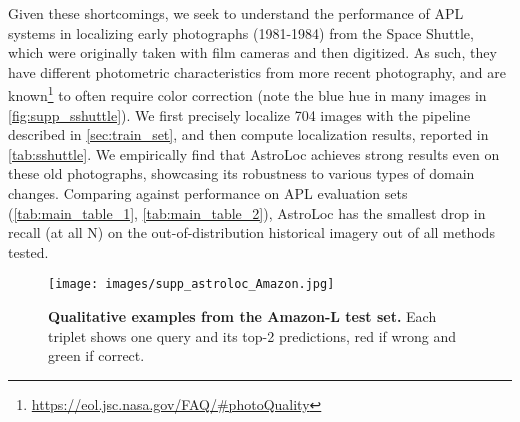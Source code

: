 Given these shortcomings, we seek to understand the performance of APL systems in localizing early photographs (1981-1984) from the Space Shuttle, which were originally taken with film cameras and then digitized. As such, they have different photometric characteristics from more recent photography, and are known\footnote{\url{https://eol.jsc.nasa.gov/FAQ/\#photoQuality}} to often require color correction (note the blue hue in many images in \cref{fig:supp_sshuttle}). We first precisely localize 704 images with the pipeline described in \cref{sec:train_set}, and then compute localization results, reported in \cref{tab:sshuttle}.
We empirically find that AstroLoc achieves strong results even on these old photographs, showcasing its robustness to various types of domain changes. Comparing against performance on APL evaluation sets (\cref{tab:main_table_1}, \ref{tab:main_table_2}), AstroLoc has the smallest drop in recall (at all N) on the out-of-distribution historical imagery out of all methods tested.


\begin{figure*}[h]
    \begin{center}
    \texttt{[image: images/supp\_astroloc\_Amazon.jpg]}
    \end{center}
    \caption{\textbf{Qualitative examples from the Amazon-L test set.} Each triplet shows one query and its top-2 predictions, red if wrong and green if correct. }
    \label{fig:supp_astroloc_Amazon}
\end{figure*}


